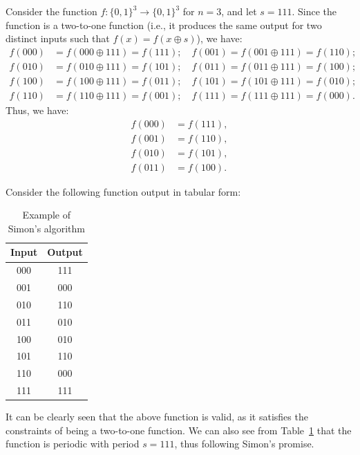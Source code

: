 \begin{example}
    Consider the function $f:\{0,1\}^3 \rightarrow \{0,1\}^3$ for $n = 3$, and let $s = 111$. Since the function is a two-to-one function (i.e., it produces the same output for two distinct inputs such that $f(x) = f(x \oplus s)$), we have:
    \begin{align*}
        f(000) &= f(000 \oplus 111) = f(111); \quad 
        f(001) = f(001 \oplus 111) = f(110); \\ 
        f(010) &= f(010 \oplus 111) = f(101); \quad 
        f(011) = f(011 \oplus 111) = f(100); \\
        f(100) &= f(100 \oplus 111) = f(011); \quad 
        f(101) = f(101 \oplus 111) = f(010); \\
        f(110) &= f(110 \oplus 111) = f(001); \quad 
        f(111) = f(111 \oplus 111) = f(000).
    \end{align*}
    Thus, we have:
    \begin{align*}
        f(000) &= f(111), \\
        f(001) &= f(110), \\
        f(010) &= f(101), \\
        f(011) &= f(100).
    \end{align*}

    Consider the following function output in tabular form:
    \begin{table}[H]
        \centering
        \begin{tabular}{|c|c|}
            \hline
            Input & Output \\
            \hline
            000 & 111 \\
            001 & 000 \\
            010 & 110 \\
            011 & 010 \\
            100 & 010 \\
            101 & 110 \\
            110 & 000 \\
            111 & 111 \\
            \hline
        \end{tabular}
        \caption{Example of Simon's algorithm}
        \label{tab:exsimon}
    \end{table}

    It can be clearly seen that the above function is valid, as it satisfies the constraints of being a two-to-one function. We can also see from Table~\ref{tab:exsimon} that the function is periodic with period $s = 111$, thus following Simon's promise.


\end{example}
